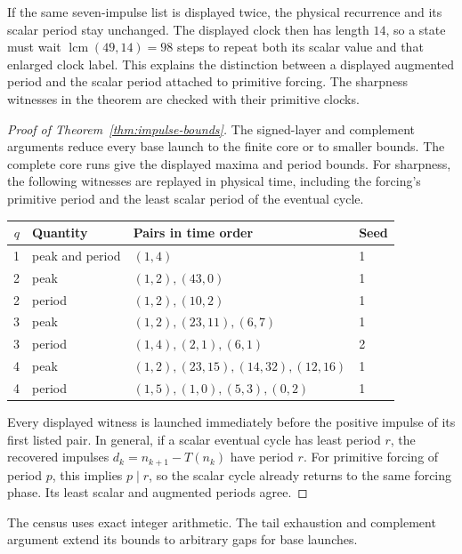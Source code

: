 If the same seven-impulse list is displayed twice, the physical
recurrence and its scalar period stay unchanged. The displayed clock
then has length $14$, so a state must wait
$\operatorname{lcm}(49,14)=98$ steps to repeat both its scalar
value and that enlarged clock label. This explains the distinction
between a displayed augmented period and the scalar period attached
to primitive forcing. The sharpness witnesses in the theorem are
checked with their primitive clocks.

\begin{proof}[Proof of Theorem~\ref{thm:impulse-bounds}]
The signed-layer and complement arguments reduce every base launch to
the finite core or to smaller bounds. The complete core runs give the
displayed maxima and period bounds. For sharpness, the following
witnesses are replayed in physical time, including the forcing's
primitive period and the least scalar period of the eventual cycle.
\begin{center}\small
\begin{tabular}{rlll}\toprule
$q$&Quantity&Pairs in time order&Seed\\\midrule
1&peak and period&$(1,4)$&1\\
2&peak&$(1,2),(43,0)$&1\\
2&period&$(1,2),(10,2)$&1\\
3&peak&$(1,2),(23,11),(6,7)$&1\\
3&period&$(1,4),(2,1),(6,1)$&2\\
4&peak&$(1,2),(23,15),(14,32),(12,16)$&1\\
4&period&$(1,5),(1,0),(5,3),(0,2)$&1\\\bottomrule
\end{tabular}
\end{center}
Every displayed witness is launched immediately before the positive
impulse of its first listed pair. In general, if a scalar eventual cycle has
least period $r$, the recovered impulses
$d_k=n_{k+1}-T(n_k)$ have period $r$. For primitive forcing of period
$p$, this implies $p\mid r$, so the scalar cycle already returns to the
same forcing phase. Its least scalar and augmented periods agree.
\end{proof}

The census uses exact integer arithmetic. The tail exhaustion and
complement argument extend its bounds to arbitrary gaps for base launches.
